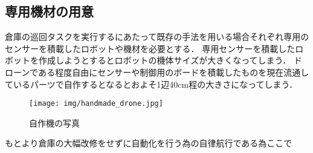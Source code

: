 \subsection{専用機材の用意}
\label{equipment_problem}
倉庫の巡回タスクを実行するにあたって既存の手法を用いる場合それぞれ専用のセンサーを積載したロボットや機材を必要とする．
専用センサーを積載したロボットを作成しようとするとロボットの機体サイズが大きくなってしまう．
ドローンである程度自由にセンサーや制御用のボードを積載したものを現在流通しているパーツで自作するとなるとおよそ1辺40cm程の大きさになってしまう．
\begin{figure}[htbp]
    \begin{center}
      \texttt{[image: img/handmade\_drone.jpg]}
      \caption{自作機の写真}
      \label{pnp_qr_img}
    \end{center}
  \end{figure}
もとより倉庫の大幅改修をせずに自動化を行う為の自律航行である為ここで